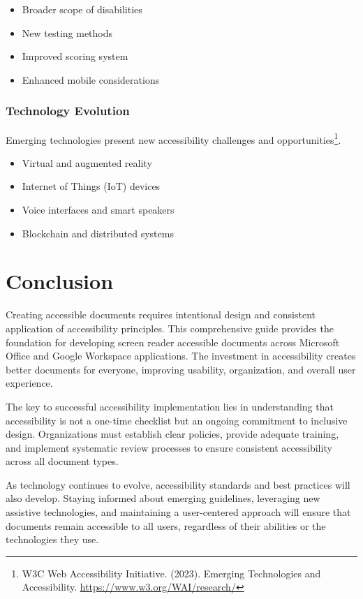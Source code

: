 \begin{itemize}
\item Broader scope of disabilities
\item New testing methods
\item Improved scoring system
\item Enhanced mobile considerations
\end{itemize}

\subsubsection{Technology Evolution}
Emerging technologies present new accessibility challenges and opportunities\footnote{W3C Web Accessibility Initiative. (2023). Emerging Technologies and Accessibility. \url{https://www.w3.org/WAI/research/}}.

\begin{itemize}
\item Virtual and augmented reality
\item Internet of Things (IoT) devices
\item Voice interfaces and smart speakers
\item Blockchain and distributed systems
\end{itemize}

\section{Conclusion}
\label{sec:conclusion-office}

Creating accessible documents requires intentional design and consistent application of accessibility principles. This comprehensive guide provides the foundation for developing screen reader accessible documents across Microsoft Office and Google Workspace applications. The investment in accessibility creates better documents for everyone, improving usability, organization, and overall user experience.

The key to successful accessibility implementation lies in understanding that accessibility is not a one-time checklist but an ongoing commitment to inclusive design. Organizations must establish clear policies, provide adequate training, and implement systematic review processes to ensure consistent accessibility across all document types.

As technology continues to evolve, accessibility standards and best practices will also develop. Staying informed about emerging guidelines, leveraging new assistive technologies, and maintaining a user-centered approach will ensure that documents remain accessible to all users, regardless of their abilities or the technologies they use.


